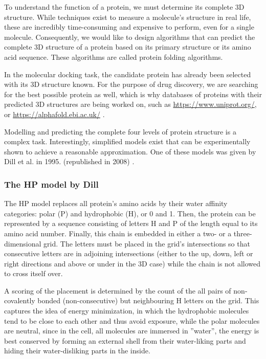 To understand the function of a protein, we must determine its complete 3D structure. While techniques exist to measure a molecule's structure in real life, these are incredibly time-consuming and expensive to perform, even for a single molecule. Consequently, we would like to design algorithms that can predict the complete 3D structure of a protein based on its primary structure or its amino acid sequence. These algorithms are called protein folding algorithms.

In the molecular docking task, the candidate protein has already been selected with its 3D structure known. For the purpose of drug discovery, we are searching for the best possible protein as well, which is why databases of proteins with their predicted 3D structures are being worked on, such as \href{https://www.uniprot.org/}{https://www.uniprot.org/}, or \href{https://alphafold.ebi.ac.uk/}{https://alphafold.ebi.ac.uk/} \cite{senior_improved_2020}.

Modelling and predicting the complete four levels of protein structure is a complex task. Interestingly, simplified models exist that can be experimentally shown to achieve a reasonable approximation. One of these models was given by Dill et al. in 1995. (republished in 2008) \cite{dill_principles_2008}.

\subsubsection{The HP model by Dill}

The HP model replaces all protein's amino acids by their water affinity categories: polar (P) and hydrophobic (H), or 0 and 1. Then, the protein can be represented by a sequence consisting of letters H and P of the length equal to its amino acid number. Finally, this chain is embedded in either a two- or a three-dimensional grid. The letters must be placed in the grid's intersections so that consecutive letters are in adjoining intersections (either to the up, down, left or right directions and above or under in the 3D case) while the chain is not allowed to cross itself over.

A scoring of the placement is determined by the count of the all pairs of non-covalently bonded (non-consecutive) but neighbouring H letters on the grid. This captures the idea of energy minimization, in which the hydrophobic molecules tend to be close to each other and thus avoid exposure, while the polar molecules are neutral, since in the cell, all molecules are immersed in ''water'', the energy is best conserved by forming an external shell from their water-liking parts and hiding their water-disliking parts in the inside.

